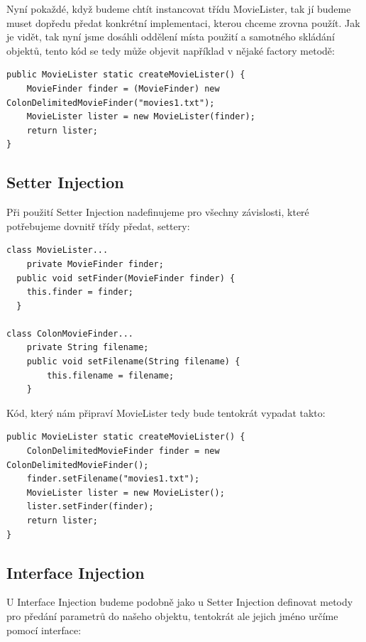 \documentclass[a4paper,conference]{IEEEtran}
\begin{document}
Nyní pokaždé, když budeme chtít instancovat třídu MovieLister, tak jí budeme muset dopředu předat konkrétní implementaci, kterou chceme zrovna použít. Jak je vidět, tak nyní jsme dosáhli oddělení místa použití a samotného skládání objektů, tento kód se tedy může objevit například v nějaké factory metodě:

\lstset{language=Java, caption=Příklad použití ve factory metodě, label=listing:Java}
\begin{lstlisting}
public MovieLister static createMovieLister() {
    MovieFinder finder = (MovieFinder) new ColonDelimitedMovieFinder("movies1.txt");
    MovieLister lister = new MovieLister(finder);
    return lister;
}
\end{lstlisting}

\subsection{Setter Injection}

Při použití Setter Injection nadefinujeme pro všechny závislosti, které potřebujeme dovnitř třídy předat, settery:

\lstset{language=Java, caption=MovieLister a Setter Injection, label=listing:Java}
\begin{lstlisting}
class MovieLister...
    private MovieFinder finder;
  public void setFinder(MovieFinder finder) {
    this.finder = finder;
  }

class ColonMovieFinder...
    private String filename;
    public void setFilename(String filename) {
        this.filename = filename;
    }
\end{lstlisting}

Kód, který nám připraví MovieLister tedy bude tentokrát vypadat takto:

\lstset{language=Java, caption=MovieLister Setter Injection a factory metoda, label=listing:Java}
\begin{lstlisting}
public MovieLister static createMovieLister() {
    ColonDelimitedMovieFinder finder = new ColonDelimitedMovieFinder();
    finder.setFilename("movies1.txt");
    MovieLister lister = new MovieLister();
    lister.setFinder(finder);
    return lister;
}
\end{lstlisting}

\subsection{Interface Injection}

U Interface Injection budeme podobně jako u Setter Injection definovat metody pro předání parametrů do našeho objektu, tentokrát ale jejich jméno určíme pomocí interface:
\end{document}
